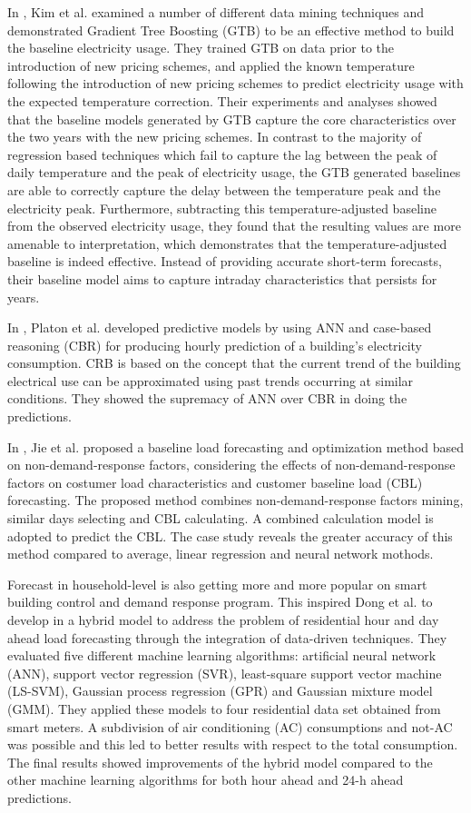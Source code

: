In \cite{7463810}, Kim et al. examined a number of different data mining techniques and demonstrated Gradient Tree Boosting (GTB) to be an effective method to build the baseline electricity usage.
They trained GTB on data prior to the introduction of new pricing schemes, and applied the known temperature following the introduction of new pricing schemes to predict electricity usage with the expected temperature correction.
Their experiments and analyses showed that the baseline models generated by GTB capture the core characteristics over the two years with the new pricing schemes.
In contrast to the majority of regression based techniques which fail to capture the lag between the peak of daily temperature and the peak of electricity usage, the GTB generated baselines are able to correctly capture the delay between the temperature peak and the electricity peak.
Furthermore, subtracting this temperature-adjusted baseline from the observed electricity usage, they found that the resulting values are more amenable to interpretation, which demonstrates that the temperature-adjusted baseline is indeed effective.
Instead of providing accurate short-term forecasts, their baseline model aims to capture intraday characteristics that persists for years.

In \cite{PLATON201510}, Platon et al. developed predictive models by using ANN and case-based reasoning (CBR) for producing hourly prediction of a building’s electricity consumption.
CRB is based on the concept that the current trend of the building electrical use can be approximated using past trends occurring at similar conditions.
They showed the supremacy of ANN over CBR in doing the predictions.

In \cite{7576207}, Jie et al. proposed a baseline load forecasting and optimization method based on non-demand-response factors, considering the effects of non-demand-response factors on costumer load characteristics and customer baseline load (CBL) forecasting.
The proposed method combines non-demand-response factors mining, similar days selecting and CBL calculating.
A combined calculation model is adopted to predict the CBL.
The case study reveals the greater accuracy of this method compared to average, linear regression and neural network mothods.

Forecast in household-level is also getting more and more popular on smart building control and demand response program.
This inspired Dong et al. to develop in \cite{DONG2016341} a hybrid model to address the problem of residential hour and day ahead load forecasting through the integration of data-driven techniques.
They evaluated five different machine learning algorithms: artificial neural network (ANN), support vector regression (SVR), least-square support vector machine (LS-SVM), Gaussian process regression (GPR) and Gaussian mixture model (GMM).
They applied these models to four residential data set obtained from smart meters.
A subdivision of air conditioning (AC) consumptions and not-AC was possible and this led to better results with respect to the total consumption.
The final results showed improvements of the hybrid model compared to the other machine learning algorithms for both hour ahead and 24-h ahead predictions.

